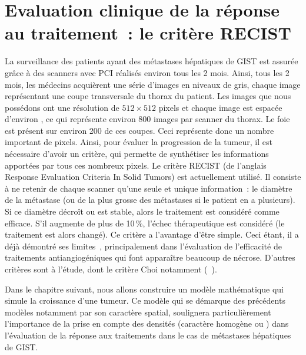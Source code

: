 \documentclass[main.tex]{subfiles}
\begin{document}
\section{Evaluation clinique de la réponse au traitement~: le critère RECIST}
La surveillance des patients ayant des métastases hépatiques de GIST est assurée grâce à des scanners avec PCI réalisés environ tous les 2 mois. Ainsi, tous les 2 mois, les médecins acquièrent une série d'images en niveaux de gris, chaque image représentant une coupe transversale du thorax du patient. Les images que nous possédons ont une résolution de $512\times512$ pixels et chaque image est espacée d'environ , ce qui représente environ 800 images par scanner du thorax. 
Le foie est présent sur environ 200 de ces coupes. 
Ceci représente donc un nombre important de pixels. 
Ainsi, pour évaluer la progression de la tumeur, il est nécessaire d'avoir un critère, qui permette de synthétiser les informations apportées par tous ces nombreux pixels. 
Le critère RECIST (de l'anglais Response Evaluation Criteria In Solid Tumors) est actuellement utilisé. 
Il consiste à ne retenir de chaque scanner qu'une seule et unique information~: le diamètre de la métastase (ou de la plus grosse des métastases si le patient en a plusieurs). Si ce diamètre décroît ou est stable, alors le traitement est considéré comme efficace. S'il augmente de plus de 10\,\%, %
 l'échec thérapeutique est considéré %
 (le traitement est alors changé). 
 Ce critère a l'avantage d'être simple. 
Ceci étant, il a déjà démontré ses limites~\cite{benjamin2007we,choi2007correlation}, principalement dans l'évaluation de l'efficacité de traitements antiangiogéniques qui font apparaître  beaucoup de nécrose. 
D'autres critères sont à l'étude, dont le critère Choi notamment  (\cf~\cite{choi2008response,kalkmann2012consensus}). 

Dans le chapitre suivant, nous allons construire un modèle mathématique qui simule la croissance d'une tumeur. Ce modèle qui se démarque des précédents modèles notamment par son caractère spatial, soulignera particulièrement l'importance de la prise en compte des densités (caractère homogène ou \heterogene) dans l'évaluation de la réponse aux traitements dans le cas de métastases hépatiques de GIST.
\end{document}
